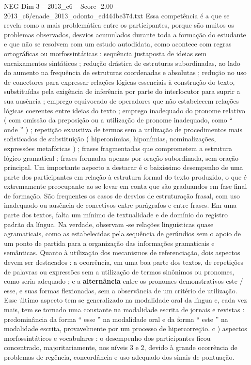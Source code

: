 \begin{textsample}{NEG Dim 3 – 2013\_c6 – Score -2.00 – 2013\_c6/enade\_2013\_odonto\_ed444be374.txt}
Essa competência é a que se revela como a mais problemática entre os participantes, porque são muitos os problemas observados, desvios acumulados durante toda a formação do estudante e que não se resolvem com um estudo autodidata, como acontece com regras ortográficas ou morfossintáticas : sequência justaposta de ideias sem encaixamentos sintáticos ; redução drástica de estruturas subordinadas, ao lado do aumento na frequência de estruturas coordenadas e absolutas ; redução no uso de conectores para expressar relações lógicas essenciais à construção do texto, substituídas pela exigência de inferência por parte do interlocutor para suprir a sua ausência ; emprego equivocado de operadores que não estabelecem relações lógicas coerentes entre ideias do texto ; emprego inadequado do pronome relativo ( com omissão da preposição ou a utilização de pronome inadequado, como “ onde ” ) ; repetição exaustiva de termos sem a utilização de procedimentos mais sofisticados de substituição ( hiperonímias, hiponímias, nominalizações, expressões metafóricas ) ; frases fragmentadas que comprometem a estrutura lógico-gramatical ; frases formadas apenas por oração subordinada, sem oração principal.
Um importante aspecto a destacar é o baixíssimo desempenho de uma parte dos participantes em relação à estrutura formal do texto produzido, o que é extremamente preocupante ao se levar em conta que são graduandos em fase final de formação.
São frequentes os casos de desvios de estruturação frasal, com uso inadequado ou ausência de conectivos entre parágrafos e entre frases.
Em uma parte dos textos, falta um mínimo de textualidade e de domínio do registro padrão da língua.
Na verdade, observam -se relações linguísticas quase agramaticais, como as estabelecidas pela sequência de gerúndios sem o apoio de um ponto de partida para a organização das informações gramaticais e semânticas.
Quanto à utilização dos mecanismos de referenciação, dois aspectos devem ser destacados : a ocorrência, em uma boa parte dos textos, de repetições de palavras ou expressões sem a utilização de termos sinônimos ou pronomes, como seria adequado ; e a \textbf{alternância} entre os pronomes demonstrativos este / esse, e suas formas flexionadas, sem a observância de um critério de utilização.
Esse último aspecto tem se generalizado na modalidade oral da língua e, cada vez mais, tem se tornado uma constante na modalidade escrita de jornais e revistas : predominância da forma “ esse ” na modalidade oral e da forma “ este ” na modalidade escrita, provavelmente por um processo de hipercorreção. c ) aspectos morfossintáticos e vocabulares : o desempenho dos participantes ficou concentrado, majoritariamente, nos níveis 3 e 2, devido à grande ocorrência de problemas de regência, concordância e uso adequado dos sinais de pontuação.

\end{textsample}
